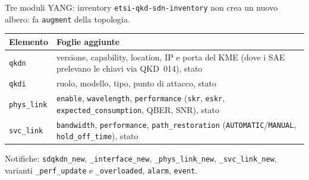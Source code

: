 \documentclass[10pt]{beamer}
\begin{document}
\begin{frame}{Tre moduli YANG: inventory}
  \small \texttt{etsi-qkd-sdn-inventory} non crea un nuovo albero: fa
  \alert{\texttt{augment}} della topologia.
  \vspace{1ex}

  \footnotesize
  \begin{tabularx}{\textwidth}{@{}l L@{}}
    \toprule
    \textbf{Elemento} & \textbf{Foglie aggiunte} \\
    \midrule
    \texttt{qkdn} & versione, capability, location, IP e porta del KME
    (dove i SAE prelevano le chiavi via QKD~014), stato \\
    \texttt{qkdi} & ruolo, modello, tipo, punto di attacco, stato \\
    \texttt{phys\_link} & \texttt{enable}, \texttt{wavelength},
    \texttt{performance} (\texttt{skr}, \texttt{eskr},
    \texttt{expected\_consumption}, QBER, SNR), stato \\
    \texttt{svc\_link} & \texttt{bandwidth}, \texttt{performance},
    \texttt{path\_restoration} (\texttt{AUTOMATIC}/\texttt{MANUAL},
    \texttt{hold\_off\_time}), stato \\
    \bottomrule
  \end{tabularx}
  \vspace{1.5ex}

  \small Notifiche: \texttt{sdqkdn\_new}, \texttt{\_interface\_new},
  \texttt{\_phys\_link\_new}, \texttt{\_svc\_link\_new}, varianti
  \texttt{\_perf\_update} e \texttt{\_overloaded}, \texttt{alarm},
  \texttt{event}.
\end{frame}
\end{document}
